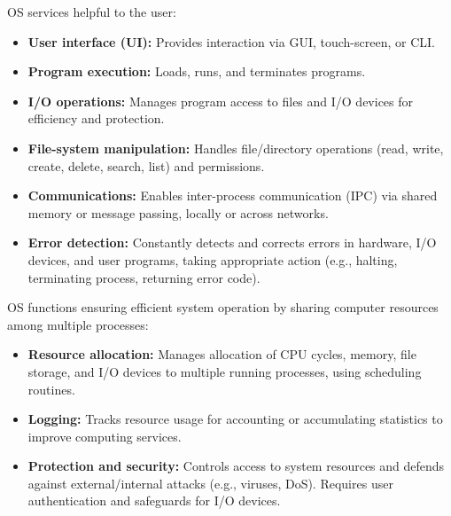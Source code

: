 OS services helpful to the user:
\begin{itemize}
    \item \textbf{User interface (UI):} Provides interaction via GUI, touch-screen, or CLI.
    \item \textbf{Program execution:} Loads, runs, and terminates programs.
    \item \textbf{I/O operations:} Manages program access to files and I/O devices for efficiency and protection.
    \item \textbf{File-system manipulation:} Handles file/directory operations (read, write, create, delete, search, list) and permissions.
    \item \textbf{Communications:} Enables inter-process communication (IPC) via shared memory or message passing, locally or across networks.
    \item \textbf{Error detection:} Constantly detects and corrects errors in hardware, I/O devices, and user programs, taking appropriate action (e.g., halting, terminating process, returning error code).
\end{itemize}
OS functions ensuring efficient system operation by sharing computer resources among multiple processes:
\begin{itemize}
    \item \textbf{Resource allocation:} Manages allocation of CPU cycles, memory, file storage, and I/O devices to multiple running processes, using scheduling routines.
    \item \textbf{Logging:} Tracks resource usage for accounting or accumulating statistics to improve computing services.
    \item \textbf{Protection and security:} Controls access to system resources and defends against external/internal attacks (e.g., viruses, DoS). Requires user authentication and safeguards for I/O devices.
\end{itemize}

